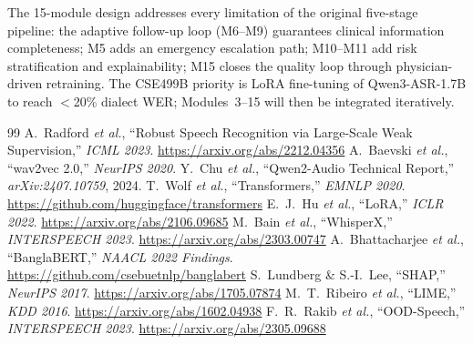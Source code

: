 \documentclass[11pt,a4paper]{article}
\begin{document}
The 15-module design addresses every limitation of the original
five-stage pipeline: the adaptive follow-up loop (M6--M9) guarantees
clinical information completeness; M5 adds an emergency escalation
path; M10--M11 add risk stratification and explainability; M15 closes
the quality loop through physician-driven retraining. The CSE499B
priority is LoRA fine-tuning of Qwen3-ASR-1.7B to reach $<$20\%
dialect WER; Modules~3--15 will then be integrated iteratively.

{\small\begin{thebibliography}{99}
  A.~Radford \emph{et al.}, ``Robust Speech Recognition via Large-Scale Weak Supervision,'' \emph{ICML 2023}. \url{https://arxiv.org/abs/2212.04356}
  A.~Baevski \emph{et al.}, ``wav2vec 2.0,'' \emph{NeurIPS 2020}.
  Y.~Chu \emph{et al.}, ``Qwen2-Audio Technical Report,'' \emph{arXiv:2407.10759}, 2024.
  T.~Wolf \emph{et al.}, ``Transformers,'' \emph{EMNLP 2020}. \url{https://github.com/huggingface/transformers}
  E.~J.~Hu \emph{et al.}, ``LoRA,'' \emph{ICLR 2022}. \url{https://arxiv.org/abs/2106.09685}
 M.~Bain \emph{et al.}, ``WhisperX,'' \emph{INTERSPEECH 2023}. \url{https://arxiv.org/abs/2303.00747}
 A.~Bhattacharjee \emph{et al.}, ``BanglaBERT,'' \emph{NAACL 2022 Findings}. \url{https://github.com/csebuetnlp/banglabert}
 S.~Lundberg \& S.-I.~Lee, ``SHAP,'' \emph{NeurIPS 2017}. \url{https://arxiv.org/abs/1705.07874}
 M.~T.~Ribeiro \emph{et al.}, ``LIME,'' \emph{KDD 2016}. \url{https://arxiv.org/abs/1602.04938}
 F.~R.~Rakib \emph{et al.}, ``OOD-Speech,'' \emph{INTERSPEECH 2023}. \url{https://arxiv.org/abs/2305.09688}
\end{thebibliography}}
\end{document}
